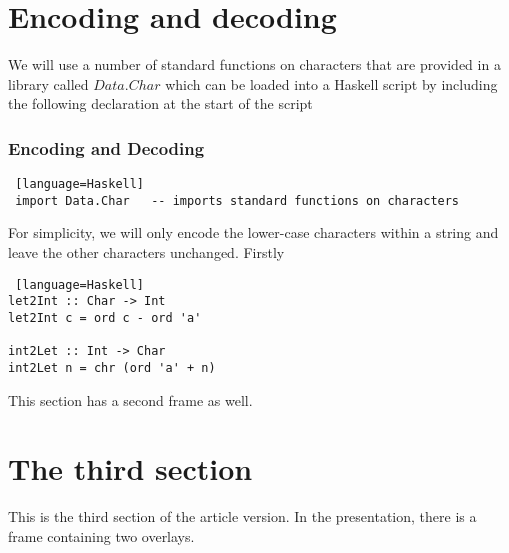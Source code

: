 \documentclass[ignorenonframetext]{beamer}
\begin{document}
\section{Encoding and decoding}
We will use a  number of standard functions on characters that are provided in a library called $Data.Char$ which can be loaded into a Haskell script by including the following declaration at the start of the script 
 \begin{frame}[fragile, label=encoding]
  \frametitle{Encoding and Decoding} 
   \begin{onlyenv}
  \begin{lstlisting} [language=Haskell]
 import Data.Char   -- imports standard functions on characters
  \end{lstlisting}
  \end{onlyenv}

    \pause
For simplicity, we will only encode the lower-case characters within a string and leave the other characters unchanged. 
Firstly 
  \begin{onlyenv}
  \begin{lstlisting} [language=Haskell]
let2Int :: Char -> Int
let2Int c = ord c - ord 'a' 

int2Let :: Int -> Char
int2Let n = chr (ord 'a' + n)
 \end{lstlisting}
  \end{onlyenv}

\end{frame}

This section has a second frame as well.


\section{The third section}

This is the third section of the article version. In the
presentation, there is a frame containing two overlays. 
\end{document}
